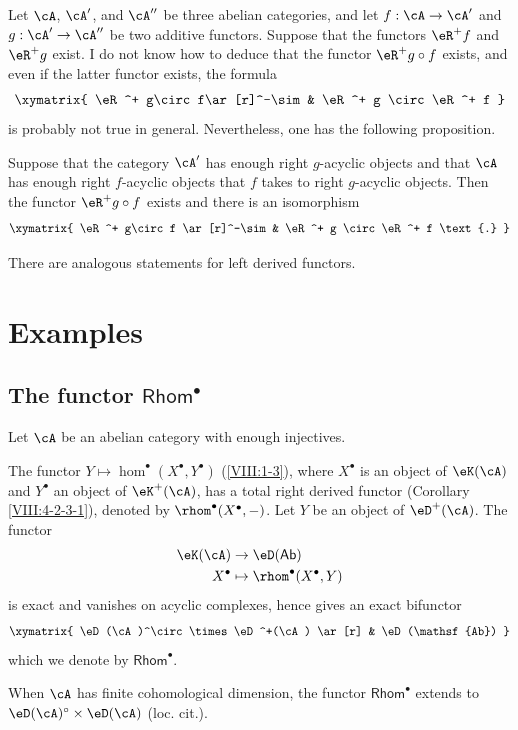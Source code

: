 \documentclass[oneside]{book}
\begin{document}
Let $\cA$, $\cA'$, and $\cA''$ be three abelian categories, and let
$f:\cA\to \cA'$ and $g:\cA'\to \cA''$ be two additive functors. Suppose
that the functors $\eR^+ f$ and $\eR^+ g$ exist. I do not know how to
deduce that the functor $\eR^+ g\circ f$ exists, and even if the latter
functor exists, the formula
\[\xymatrix{
  \eR^+ g\circ f\ar[r]^-\sim
    & \eR^+ g \circ \eR^+ f
}\]
is probably not true in general. Nevertheless, one has the following
proposition.

\begin{proposition}\label{VIII:4-3-1}
Suppose that the category $\cA'$ has enough right $g$-acyclic objects and
that $\cA$ has enough right $f$-acyclic objects that $f$ takes to right
$g$-acyclic objects. Then the functor $\eR^+ g\circ f$ exists and there
is an isomorphism
\[\xymatrix{
  \eR^+ g\circ f \ar[r]^-\sim
    & \eR^+ g \circ \eR^+ f \text{.}
}\]
\end{proposition}

There are analogous statements for left derived functors.

\section{Examples}\label{VIII:6} %

\subsection{The functor \texorpdfstring{$\mathsf{Rhom}^\bullet$}{Hom*}}\label{VIII:6-1}

Let $\cA$ be an abelian category with enough injectives.

The functor $Y\mapsto \hom^\bullet(X^\bullet,Y^\bullet)$
(\ref{VIII:1-3}), where $X^\bullet$ is an object of $\eK(\cA)$ and
$Y^\bullet$ an object of $\eK^+(\cA)$, has a total right derived functor
(Corollary \ref{VIII:4-2-3-1}), denoted by
$\rhom^\bullet(X^\bullet,-)$. Let $Y$ be an object of $\eD^+(\cA)$.
The functor
\begin{align*}
  \eK(\cA) &\to \eD(\mathsf{Ab}) \\
  X^\bullet &\mapsto \rhom^\bullet(X^\bullet,Y)
\end{align*}
is exact and vanishes on acyclic complexes, hence gives an exact
bifunctor
\[\xymatrix{
  \eD(\cA)^\circ \times \eD^+(\cA) \ar[r]
    & \eD(\mathsf{Ab})
}\]
which we denote by $\mathsf{Rhom}^\bullet$.

When $\cA$ has finite cohomological dimension, the functor
$\mathsf{Rhom}^\bullet$ extends to
$\eD(\cA)^\circ\times \eD(\cA)$ (loc. cit.).
\end{document}
